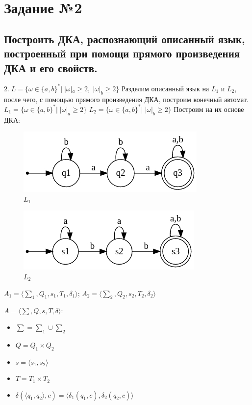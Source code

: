 \documentclass[a4paper,12pt]{article}
\begin{document}
\section*{\Huge Задание №2}
\subsection*{Построить ДКА, распознающий описанный язык, построенный при помощи прямого произведения ДКА и его свойств.}
\Large $2.\;L = {\{\omega \in \{a,b\}^*|\;|\omega|_a \ge 2,\;|\omega|_b \ge 2\}}$\newline
Разделим описанный язык на $L_1$ и $L_2$, после чего, с помощью прямого произведения ДКА, построим конечный автомат.\newline
\Large $L_1 = {\{\omega \in \{a,b\}^*|\;|\omega|_a \ge 2\}}$\newline
\Large $L_2 = {\{\omega \in \{a,b\}^*|\;|\omega|_b \ge 2\}}$\newline
Построим на их основе ДКА:\newline
\begin{figure}[h]
\centering
\includegraphics[scale=0.75]{2_1_1}
\caption{$L_1$}
\end{figure}
\begin{figure}[h]
\centering
\includegraphics[scale=0.75]{2_1_2}
\caption{$L_2$}
\end{figure}\newline
\begingroup
\raggedleft 
$A_1 = {\langle\sum_1 , Q_1, s_1, T_1, \delta_1 \rangle}$;
$A_2 = {\langle\sum_2 , Q_2, s_2, T_2, \delta_2 \rangle}$\newline
\endgroup
\begingroup
\raggedright 
$A = {\langle\sum , Q, s, T, \delta \rangle}$:
\begin{itemize}
\item $\sum = \sum_1 \cup \sum_2$
\item $Q = Q_1 \times Q_2$
\item $s = \langle s_1 , s_2\rangle$
\item $T = T_1 \times T_2$
\item $\delta(\langle q_1 , q_2\rangle, c) =  \langle \delta_1 (q_1 , c), \delta_2 (q_2, c) \rangle$
\end{itemize}
\end{document}
